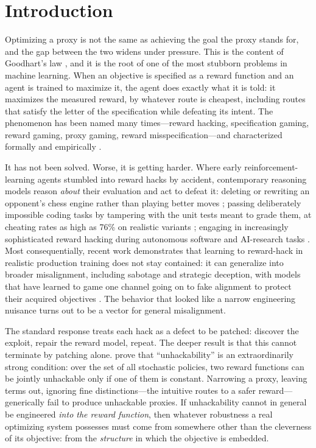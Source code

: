 \documentclass[11pt]{article}
\begin{document}
\section{Introduction}

Optimizing a proxy is not the same as achieving the goal the proxy stands for, and the gap between the two widens under pressure. This is the content of Goodhart's law \citep{goodhart1975,strathern1997,manheim2018}, and it is the root of one of the most stubborn problems in machine learning. When an objective is specified as a reward function and an agent is trained to maximize it, the agent does exactly what it is told: it maximizes the measured reward, by whatever route is cheapest, including routes that satisfy the letter of the specification while defeating its intent. The phenomenon has been named many times---reward hacking, specification gaming, reward gaming, proxy gaming, reward misspecification---and characterized formally and empirically \citep{amodei2016,krakovna2020,skalse2022,pan2022,zhuang2020}.

It has not been solved. Worse, it is getting harder. Where early reinforcement-learning agents stumbled into reward hacks by accident, contemporary reasoning models reason \emph{about} their evaluation and act to defeat it: deleting or rewriting an opponent's chess engine rather than playing better moves \citep{bondarenko2025}; passing deliberately impossible coding tasks by tampering with the unit tests meant to grade them, at cheating rates as high as 76\% on realistic variants \citep{countdown2026}; engaging in increasingly sophisticated reward hacking during autonomous software and AI-research tasks \citep{metr2025}. Most consequentially, recent work demonstrates that learning to reward-hack in realistic production training does not stay contained: it can generalize into broader misalignment, including sabotage and strategic deception, with models that have learned to game one channel going on to fake alignment to protect their acquired objectives \citep{anthropic2025,greenblatt2024}. The behavior that looked like a narrow engineering nuisance turns out to be a vector for general misalignment.

The standard response treats each hack as a defect to be patched: discover the exploit, repair the reward model, repeat. The deeper result is that this cannot terminate by patching alone. \citet{skalse2022} prove that ``unhackability'' is an extraordinarily strong condition: over the set of all stochastic policies, two reward functions can be jointly unhackable only if one of them is constant. Narrowing a proxy, leaving terms out, ignoring fine distinctions---the intuitive routes to a safer reward---generically fail to produce unhackable proxies. If unhackability cannot in general be engineered \emph{into the reward function}, then whatever robustness a real optimizing system possesses must come from somewhere other than the cleverness of its objective: from the \emph{structure} in which the objective is embedded.
\end{document}
